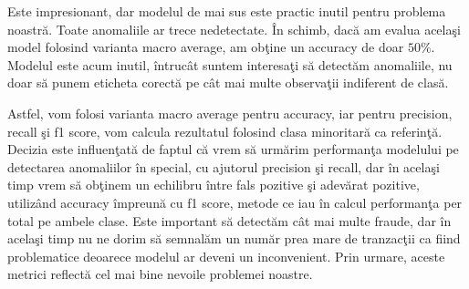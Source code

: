 Este impresionant, dar modelul de mai sus este practic inutil pentru problema noastră.
Toate anomaliile ar trece nedetectate. În schimb, dacă am evalua acelaşi model folosind
varianta macro average, am obţine un accuracy de doar $50\%$. Modelul este acum inutil,
întrucât suntem interesaţi să detectăm anomaliile, nu doar să punem eticheta corectă 
pe cât mai multe observaţii indiferent de clasă.

Astfel, vom folosi varianta macro average pentru accuracy, iar pentru precision, recall şi 
f1 score, vom calcula rezultatul folosind clasa minoritară ca referinţă. Decizia este influenţată
de faptul că vrem să urmărim performanţa modelului pe detectarea anomaliilor în special, cu ajutorul
precision şi recall, dar în acelaşi timp vrem să obţinem un echilibru între fals pozitive şi 
adevărat pozitive, utilizând accuracy împreună cu f1 score, metode ce iau în calcul performanţa 
per total pe ambele clase. Este important să detectăm cât mai multe fraude, dar în acelaşi timp nu ne dorim să semnalăm un număr prea mare de tranzacţii ca fiind problematice deoarece modelul ar deveni un inconvenient. Prin urmare, aceste metrici reflectă cel mai bine nevoile problemei noastre.